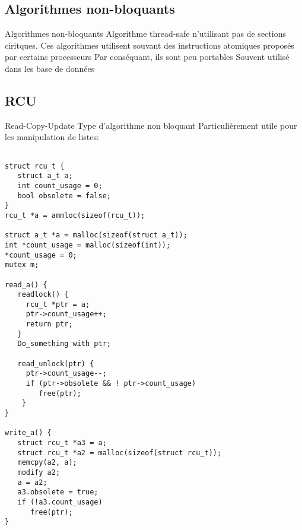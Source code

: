 \subsection{Algorithmes non-bloquants}
\begin{frame}{Algorithmes non-bloquants}
Algorithme thread-safe n'utilisant pas de sections ciritques. 
Ces algorithmes utilisent souvant des instructions atomiques proposés par certains processeurs
Par conséquant, ils sont peu portables
Souvent utilisé dans les base de données
\end{frame} 

\subsection{RCU}
\begin{frame}[fragile]{Read-Copy-Update}
Type d'algorithme non bloquant
Particulièrement utile pour les manipulation de listes:


\begin{lstlisting} 

struct rcu_t {
   struct a_t a;
   int count_usage = 0;
   bool obsolete = false;
}
rcu_t *a = ammloc(sizeof(rcu_t)); 

struct a_t *a = malloc(sizeof(struct a_t));
int *count_usage = malloc(sizeof(int));
*count_usage = 0;
mutex m;

read_a() {
   readlock() {
     rcu_t *ptr = a;
     ptr->count_usage++;
     return ptr;
   }
   Do_something with ptr;

   read_unlock(ptr) {
     ptr->count_usage--;
     if (ptr->obsolete && ! ptr->count_usage)
        free(ptr);
    }
}

write_a() { 
   struct rcu_t *a3 = a;
   struct rcu_t *a2 = malloc(sizeof(struct rcu_t));
   memcpy(a2, a);
   modify a2;   
   a = a2;  
   a3.obsolete = true;
   if (!a3.count_usage)
      free(ptr);
}
\end{lstlisting} 
\end{frame} 
